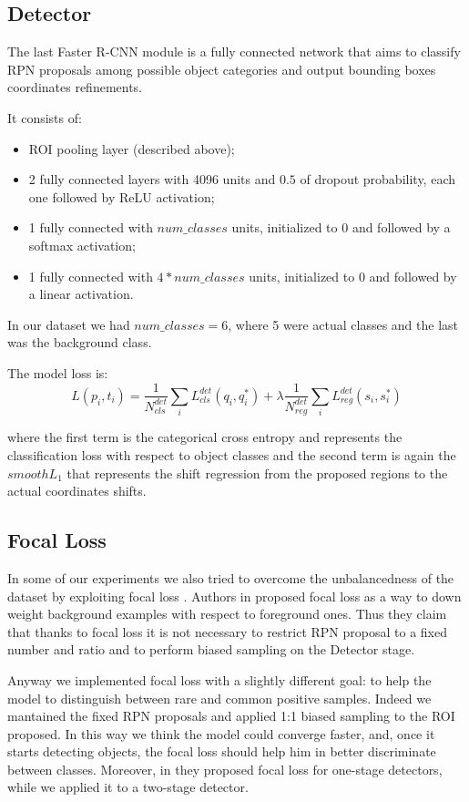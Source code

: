 \documentclass[a4paper,10pt]{report}
\begin{document}
\subsection{Detector}\label{subsec:detector}
The last Faster R-CNN module is a fully connected network that aims to classify RPN proposals among possible object categories and output bounding boxes coordinates refinements.

It consists of:
\begin{itemize}
    \item ROI pooling layer (described above);
    \item 2 fully connected layers with 4096 units and $0.5$ of dropout probability, each one followed by ReLU activation;
    \item 1 fully connected with $num\_classes$ units, initialized to 0 and followed by a softmax activation;
    \item 1 fully connected with $4*num\_classes$ units, initialized to 0 and followed by a linear activation.
\end{itemize}
In our dataset we had $num\_classes=6$, where 5 were actual classes and the last was the background class.

The model loss is:
\[L({p_i}, {t_i}) = \dfrac{1}{N_{cls}^{det}} \sum_{i} L_{cls}^{det}(q_i, q_i^*) + \lambda \dfrac{1}{N_{reg}^{det}} \sum_{i}L_{reg}^{det}(s_i, s_i^*) \]

where the first term is the categorical cross entropy and represents the classification loss with respect to object classes and the second term is again the $smooth L_1$ that represents the shift regression from the proposed regions to the actual coordinates shifts.

\subsection{Focal Loss}\label{subsec:focal-loss}
In some of our experiments we also tried to overcome the unbalancedness of the dataset by exploiting focal loss \cite{focal-loss}.
Authors in \cite{focal-loss} proposed focal loss as a way to down weight background examples with respect to foreground ones. Thus they claim that thanks to focal loss it is not necessary to restrict RPN proposal to a fixed number and ratio and to perform biased sampling on the Detector stage.

Anyway we implemented focal loss with a slightly different goal: to help the model to distinguish between rare and common positive samples. Indeed we mantained the fixed RPN proposals and applied 1:1 biased sampling to the ROI proposed. In this way we think the model could converge faster, and, once it starts detecting objects, the focal loss should help him in better discriminate between classes.
Moreover, in \cite{focal-loss} they proposed focal loss for one-stage detectors, while we applied it to a two-stage detector.
\end{document}
